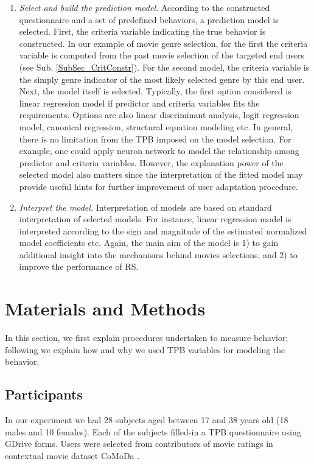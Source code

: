 \documentclass{llncs}
\begin{document}
\begin{enumerate}
 \item {\it Select and build the prediction model.} According to the constructed questionnaire and a set of predefined behaviors, a prediction model is selected. First, the criteria variable indicating the true behavior is constructed. In our example of movie genre selection, for the first the criteria variable is computed from the past movie selection of the targeted end users (see Sub. \ref{SubSec_CritConstr}).  For the second model, the criteria variable is the simply genre indicator of the most likely selected genre by this end user. Next, the model itself is selected. Typically, the first option considered is linear regression model if predictor and criteria variables fits the requirements. Options are also linear discriminant analysis, logit regression model, canonical regression, structural equation modeling etc. In general, there is no limitation from the TPB imposed on the model selection. For example, one could apply neuron network to model the relationship among predictor and criteria variables. However, the explanation power of the selected model also matters since the interpretation of the fitted model may provide useful hints for further improvement of user adaptation procedure. 
 \item {\it Interpret the model.} Interpretation of models are based on standard interpretation of selected models. For instance, linear regression model is interpreted according to the sign and magnitude of the estimated normalized model coefficients etc. Again, the main aim of the model is 1) to gain additional insight into the mechanisms behind movies selections, and 2) to improve the performance of RS. 
\end{enumerate}


\section{Materials and Methods}\label{Sec_MatAndMeths}  

In this section, we first explain procedures undertaken to measure behavior; following we explain how and why we used TPB variables for modeling the behavior.   


\subsection{Participants}\label{SubSec_Participants}

In our experiment we had 28 subjects aged between 17 and 38 years old (18 males and 10 females). Each of the subjects filled-in a TPB questionnaire using GDrive forms. Users were selected from contributors of movie ratings in contextual movie dataset CoMoDa \cite{CoMoDa2009}.
\end{document}
